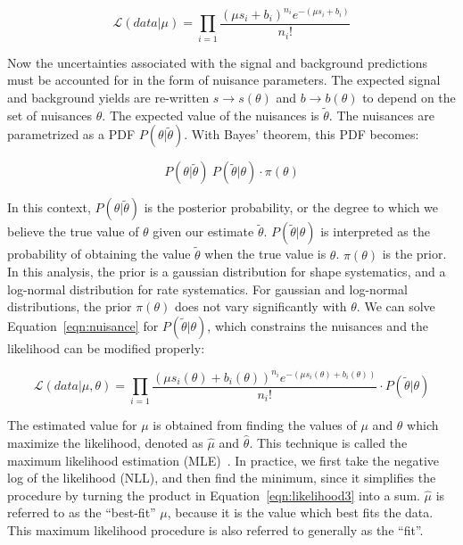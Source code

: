 \begin{equation}
\label{eqn:likelihood2}
\mathcal{L}(data|\mu) = \prod_{i=1} \frac{(\mu s_{i}+b_{i})^{n_{i}}e^{-(\mu s_{i}+b_{i})}}{n_{i}!}
\end{equation}

\noindent Now the uncertainties associated with the signal and background predictions must be accounted for in the form of nuisance parameters. The expected signal
and background yields are re-written $s \rightarrow s(\theta)$ and $b \rightarrow b(\theta)$ to depend on the set of nuisances $\theta$. The expected value of the nuisances
is $\tilde{\theta}$. The nuisances are parametrized as a PDF $P(\theta|\tilde{\theta})$. With Bayes' theorem, this PDF becomes:

\begin{equation}
\label{eqn:nuisance}
P(\theta|\tilde{\theta}) ~ P(\tilde{\theta}|\theta) \cdot \pi(\theta)
\end{equation}

In this context, $P(\theta|\tilde{\theta})$ is the posterior probability, or the degree to which we believe the true value of $\theta$ given our estimate $\tilde{\theta}$.
$P(\tilde{\theta}|\theta)$ is interpreted as the probability of obtaining the value $\tilde{\theta}$ when the true value is $\theta$. $\pi(\theta)$ is the prior.
In this analysis, the prior is a gaussian distribution for shape systematics, and a log-normal distribution for rate systematics. For gaussian and log-normal distributions,
the prior $\pi(\theta)$ does not vary significantly with $\theta$. We can solve Equation~\ref{eqn:nuisance} for $P(\tilde{\theta}|\theta)$, which constrains the nuisances
and the likelihood can be modified properly:

\begin{equation}
\label{eqn:likelihood3}
\mathcal{L}(data|\mu,\theta) = \prod_{i=1} \frac{(\mu s_{i}(\theta)+b_{i}(\theta))^{n_{i}}e^{-(\mu s_{i}(\theta)+b_{i}(\theta))}}{n_{i}!} \cdot P(\tilde{\theta}|\theta)
\end{equation}

\noindent The estimated value for $\mu$ is obtained from finding the values of $\mu$ and $\theta$ which maximize the likelihood, denoted as $\hat{\mu}$ and $\hat{\theta}$.
This technique is called the maximum likelihood estimation (MLE)~\cite{lista}.
In practice, we first take the negative log of the likelihood (NLL), and then find the minimum, since it simplifies
the procedure by turning the product in Equation~\ref{eqn:likelihood3} into a sum. $\hat{\mu}$ is referred to as the ``best-fit'' $\mu$, because it is the value which best fits the data.
This maximum likelihood procedure is also referred to generally as the ``fit''. 


